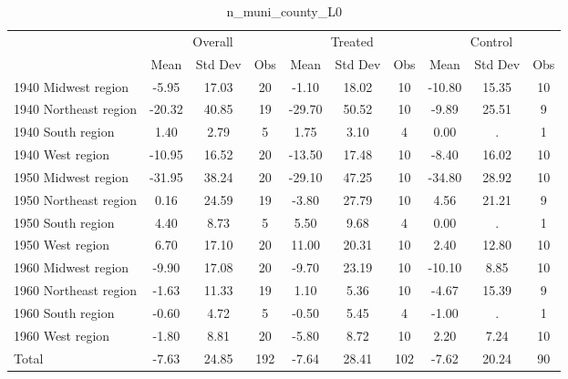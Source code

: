 \begin{table}[htbp]\centering
\def\sym#1{\ifmmode^{#1}\else\(^{#1}\)\fi}
\caption{n\_muni\_county\_L0 \label{tab1}}
\begin{tabular}{l*{3}{ccc}}
\toprule
                    &\multicolumn{3}{c}{Overall}           &\multicolumn{3}{c}{Treated}           &\multicolumn{3}{c}{Control}           \\
                    &        Mean&     Std Dev&         Obs&        Mean&     Std Dev&         Obs&        Mean&     Std Dev&         Obs\\
\midrule
1940 Midwest region &       -5.95&       17.03&          20&       -1.10&       18.02&          10&      -10.80&       15.35&          10\\
1940 Northeast region&      -20.32&       40.85&          19&      -29.70&       50.52&          10&       -9.89&       25.51&           9\\
1940 South region   &        1.40&        2.79&           5&        1.75&        3.10&           4&        0.00&           .&           1\\
1940 West region    &      -10.95&       16.52&          20&      -13.50&       17.48&          10&       -8.40&       16.02&          10\\
1950 Midwest region &      -31.95&       38.24&          20&      -29.10&       47.25&          10&      -34.80&       28.92&          10\\
1950 Northeast region&        0.16&       24.59&          19&       -3.80&       27.79&          10&        4.56&       21.21&           9\\
1950 South region   &        4.40&        8.73&           5&        5.50&        9.68&           4&        0.00&           .&           1\\
1950 West region    &        6.70&       17.10&          20&       11.00&       20.31&          10&        2.40&       12.80&          10\\
1960 Midwest region &       -9.90&       17.08&          20&       -9.70&       23.19&          10&      -10.10&        8.85&          10\\
1960 Northeast region&       -1.63&       11.33&          19&        1.10&        5.36&          10&       -4.67&       15.39&           9\\
1960 South region   &       -0.60&        4.72&           5&       -0.50&        5.45&           4&       -1.00&           .&           1\\
1960 West region    &       -1.80&        8.81&          20&       -5.80&        8.72&          10&        2.20&        7.24&          10\\
Total               &       -7.63&       24.85&         192&       -7.64&       28.41&         102&       -7.62&       20.24&          90\\
\bottomrule
\end{tabular}
\end{table}
